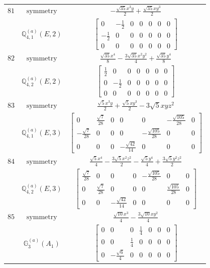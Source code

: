 \documentclass[fleqn,8pt,landscape]{jsarticle}
\begin{document}
\begin{longtable}{ccc}
$ 81 $ & $ \text{symmetry} $ & $ - \frac{\sqrt{35} x^{3} y}{2} + \frac{\sqrt{35} x y^{3}}{2} $ \\
$  $ & $ \mathbb{Q}_{4,1}^{(a)}(E,2) $ & $ \begin{bmatrix} 0 & - \frac{1}{2} & 0 & 0 & 0 & 0 & 0 \\ - \frac{1}{2} & 0 & 0 & 0 & 0 & 0 & 0 \\ 0 & 0 & 0 & 0 & 0 & 0 & 0 \end{bmatrix} $ \\ \hline
$ 82 $ & $ \text{symmetry} $ & $ \frac{\sqrt{35} x^{4}}{8} - \frac{3 \sqrt{35} x^{2} y^{2}}{4} + \frac{\sqrt{35} y^{4}}{8} $ \\
$  $ & $ \mathbb{Q}_{4,2}^{(a)}(E,2) $ & $ \begin{bmatrix} \frac{1}{2} & 0 & 0 & 0 & 0 & 0 & 0 \\ 0 & - \frac{1}{2} & 0 & 0 & 0 & 0 & 0 \\ 0 & 0 & 0 & 0 & 0 & 0 & 0 \end{bmatrix} $ \\ \hline
$ 83 $ & $ \text{symmetry} $ & $ \frac{\sqrt{5} x^{3} y}{2} + \frac{\sqrt{5} x y^{3}}{2} - 3 \sqrt{5} x y z^{2} $ \\
$  $ & $ \mathbb{Q}_{4,1}^{(a)}(E,3) $ & $ \begin{bmatrix} 0 & \frac{\sqrt{7}}{28} & 0 & 0 & 0 & - \frac{\sqrt{105}}{28} & 0 \\ - \frac{\sqrt{7}}{28} & 0 & 0 & 0 & - \frac{\sqrt{105}}{28} & 0 & 0 \\ 0 & 0 & 0 & - \frac{\sqrt{42}}{14} & 0 & 0 & 0 \end{bmatrix} $ \\ \hline
$ 84 $ & $ \text{symmetry} $ & $ \frac{\sqrt{5} x^{4}}{4} - \frac{3 \sqrt{5} x^{2} z^{2}}{2} - \frac{\sqrt{5} y^{4}}{4} + \frac{3 \sqrt{5} y^{2} z^{2}}{2} $ \\
$  $ & $ \mathbb{Q}_{4,2}^{(a)}(E,3) $ & $ \begin{bmatrix} \frac{\sqrt{7}}{28} & 0 & 0 & 0 & - \frac{\sqrt{105}}{28} & 0 & 0 \\ 0 & \frac{\sqrt{7}}{28} & 0 & 0 & 0 & \frac{\sqrt{105}}{28} & 0 \\ 0 & 0 & - \frac{\sqrt{42}}{14} & 0 & 0 & 0 & 0 \end{bmatrix} $ \\ \hline
$ 85 $ & $ \text{symmetry} $ & $ \frac{\sqrt{10} x^{3}}{4} - \frac{3 \sqrt{10} x y^{2}}{4} $ \\
$  $ & $ \mathbb{G}_{3}^{(a)}(A_{1}) $ & $ \begin{bmatrix} 0 & 0 & 0 & \frac{1}{4} & 0 & 0 & 0 \\ 0 & 0 & \frac{1}{4} & 0 & 0 & 0 & 0 \\ 0 & - \frac{\sqrt{6}}{4} & 0 & 0 & 0 & 0 & 0 \end{bmatrix} $ \\ \hline

\end{longtable}
\end{document}
